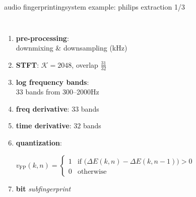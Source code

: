         
        \begin{frame}{audio fingerprinting}{system example: philips extraction 1/3}
            \begin{footnotesize}
                \begin{columns}[T]
                        \scalebox{.75}
                        {
                            \centering
                            
                        }
                        \begin{enumerate}
                            \item<1->	\textbf{pre-processing}:\\ downmixing \& downsampling (\unit[5]{kHz})
                            \item<2->	\textbf{STFT}: $\mathcal{K}=2048$, overlap $\frac{31}{32}$
                            \item<3->	\textbf{log frequency bands}:\\ $33$ bands from 300--2000\unit{Hz}
                            \item<4->	\textbf{freq derivative}: $33$ bands
                            \item<4->	\textbf{time derivative}: $32$ bands
                            \item<5->	\textbf{quantization}: 
                                \begin{tiny}
                                    \begin{equation*}\label{eq:fingerprint}
                                        v_\mathrm{FP}(k,n)	= \begin{cases}
                                                        1 & \text{if } \big(\Delta{E}(k,n) - \Delta{E}(k,n-1)\big) > 0\\
                                                        0 & \text{otherwise}
                                                    \end{cases}\nonumber
                                    \end{equation*}
                                \end{tiny}

                            \item<6->[$\Rightarrow$]	\textbf{\unit[32]{bit}} \textit{subfingerprint}
                        \end{enumerate}
                \end{columns}
            \end{footnotesize}
        \end{frame}

